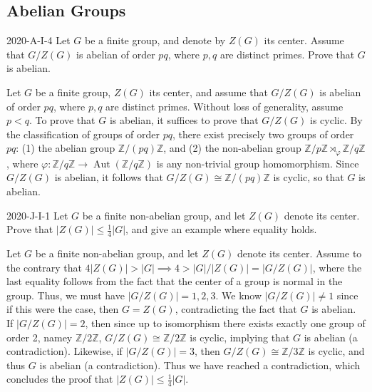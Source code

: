 \documentclass{article}
\begin{document}
	\newpage
	\subsection{Abelian Groups}
	
	\begin{prb}{2020-A-I-4}
		Let $G$ be a finite group, and denote by $Z(G)$ its center. Assume that $G/Z(G)$ is abelian of order $pq$, where $p,q$ are distinct primes. Prove that $G$ is abelian. 
	\end{prb}
	Let $G$ be a finite group, $Z(G)$ its center, and assume that $G/Z(G)$ is abelian of order $pq$, where $p, q$ are distinct primes. Without loss of generality, assume $p < q$. To prove that $G$ is abelian, it suffices to prove that $G/Z(G)$ is cyclic. By the classification of groups of order $pq$, there exist precisely two groups of order $pq$: (1) the abelian group $\mathbb{Z}/(pq)\mathbb{Z}$, and (2) the non-abelian group $\mathbb{Z}/p\mathbb{Z} \rtimes_{\varphi} \mathbb{Z}/q\mathbb{Z}$, where $\varphi: \mathbb{Z}/q\mathbb{Z} \to \operatorname{Aut}(\mathbb{Z}/q\mathbb{Z})$ is any non-trivial group homomorphism. Since $G/Z(G)$ is abelian, it follows that $G/Z(G) \cong \mathbb{Z}/(pq)\mathbb{Z}$ is cyclic, so that $G$ is abelian. 
	
	\begin{prb}{2020-J-I-1}
		Let $G$ be a finite non-abelian group, and let $Z(G)$ denote its center. Prove that $|Z(G)| \leq \frac{1}{4}|G|$, and give an example where equality holds. 
	\end{prb}
	Let $G$ be a finite non-abelian group, and let $Z(G)$ denote its center. Assume to the contrary that $4|Z(G)| > |G| \implies 4 > |G|/|Z(G)| = |G/Z(G)|$, where the last equality follows from the fact that the center of a group is normal in the group. Thus, we must have $|G/Z(G)| = 1, 2, 3$. We know $|G/Z(G)| \neq 1$ since if this were the case, then $G = Z(G)$, contradicting the fact that $G$ is abelian. If $|G/Z(G)| = 2$, then since up to isomorphism there exists exactly one group of order 2, namey $\mathbb{Z}/2\mathbb{Z}$, $G/Z(G) \cong \mathbb{Z}/2\mathbb{Z}$ is cyclic, implying that $G$ is abelian (a contradiction). Likewise, if $|G/Z(G)| = 3$, then $G/Z(G) \cong \mathbb{Z}/3\mathbb{Z}$ is cyclic, and thus $G$ is abelian (a contradiction). Thus we have reached a contradiction, which concludes the proof that $|Z(G)| \leq \frac{1}{4}|G|$. 
	
\end{document}
